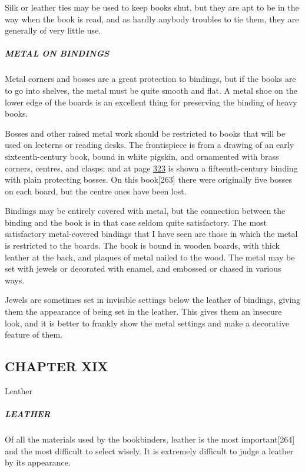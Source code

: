 \documentclass[
]{article}
\begin{document}
Silk or leather ties may be used to keep books shut, but they are apt to
be in the way when the book is read, and as hardly anybody troubles to
tie them, they are generally of very little use.

\hypertarget{metal-on-bindings}{%
\subparagraph{METAL ON BINDINGS}\label{metal-on-bindings}}

Metal corners and bosses are a great protection to bindings, but if the
books are to go into shelves, the metal must be quite smooth and flat. A
metal shoe on the lower edge of the boards is an excellent thing for
preserving the binding of heavy books.

Bosses and other raised metal work should be restricted to books that
will be used on lecterns or reading desks. The frontispiece is from a
drawing of an early sixteenth-century book, bound in white pigskin, and
ornamented with brass corners, centres, and clasps; and at page
\protect\hyperlink{Page_323}{323} is shown a fifteenth-century binding
with plain protecting bosses. On this
book{\protect\hypertarget{Page_263}{}{{[}263{]}}} there were originally
five bosses on each board, but the centre ones have been lost.

Bindings may be entirely covered with metal, but the connection between
the binding and the book is in that case seldom quite satisfactory. The
most satisfactory metal-covered bindings that I have seen are those in
which the metal is restricted to the boards. The book is bound in wooden
boards, with thick leather at the back, and plaques of metal nailed to
the wood. The metal may be set with jewels or decorated with enamel, and
embossed or chased in various ways.

Jewels are sometimes set in invisible settings below the leather of
bindings, giving them the appearance of being set in the leather. This
gives them an insecure look, and it is better to frankly show the metal
settings and make a decorative feature of them.

\hypertarget{chapter-xix}{%
\subsection[CHAPTER
XIX]{\texorpdfstring{\protect\hypertarget{CHAPTER_XIX}{}{}CHAPTER
XIX}{CHAPTER XIX}}\label{chapter-xix}}

Leather

\hypertarget{leather}{%
\subparagraph{LEATHER}\label{leather}}

{Of} all the materials used by the bookbinders, leather is the most
important{\protect\hypertarget{Page_264}{}{{[}264{]}}} and the most
difficult to select wisely. It is extremely difficult to judge a leather
by its appearance.
\end{document}
